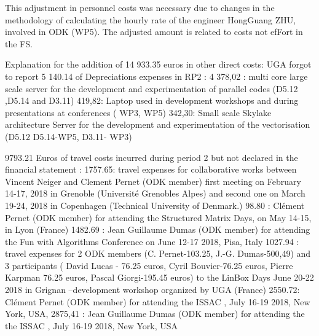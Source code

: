 This adjustment in personnel costs was necessary due to changes in the methodology of calculating the hourly rate of the engineer HongGuang ZHU, involved in ODK (WP5). The adjusted amount is related to costs not efFort in the FS.

 Explanation for the addition of 14 933.35 euros in other direct costs:
UGA forgot to report
 5 140.14 of Depreciations expenses in RP2 : 
 4 378,02 : multi core large scale server for the development and experimentation of parallel codes (D5.12 ,D5.14 and D3.11)
 419,82: Laptop used in  development workshops and during presentations at conferences ( WP3, WP5) 
 342,30: Small scale Skylake architecture Server for the development and experimentation of the vectorisation (D5.12 D5.14-WP5, D3.11- WP3)

 9793.21 Euros of travel costs incurred during period 2 but not declared in the financial statement :
 1757.65: travel expenses  for collaborative works between Vincent Neiger and Clement Pernet (ODK member) first meeting on February 14-17, 2018 in Grenoble (Université Grenobles Alpes) and second one on March 19-24, 2018 in Copenhagen (Technical University of Denmark.)
 98.80 : Clément Pernet (ODK member) for attending the Structured Matrix Days, on May 14-15, in Lyon (France)
 1482.69 : Jean Guillaume Dumas (ODK member) for attending the Fun with Algorithms Conference on June 12-17 2018, Pisa, Italy
 1027.94 : travel expenses for 2 ODK members (C. Pernet-103.25, J.-G. Dumas-500,49) and 3 participants ( David Lucas - 76.25 euros, Cyril Bouvier-76.25 euros, Pierre Karpman 76.25 euros, Pascal Giorgi-195.45 euros) to the LinBox Days June 20-22 2018 in Grignan –development workshop organized by UGA (France)
 2550.72: Clément Pernet (ODK member) for attending the ISSAC , July 16-19 2018, New York, USA,
 2875,41 : Jean Guillaume Dumas (ODK member) for attending the the ISSAC , July 16-19 2018, New York, USA

\subsubsection{}

